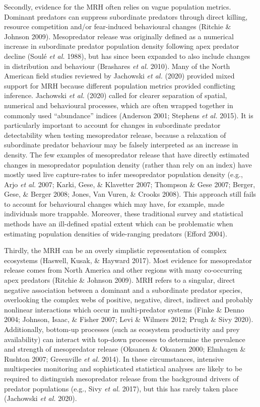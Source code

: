 \documentclass[11pt,a4paper,titlepage,twoside,openright]{style/unimelbthesis}
\begin{document}
\begin{mainmatter}
Secondly, evidence for the MRH often relies on vague population metrics. Dominant predators can suppress subordinate predators through direct killing, resource competition and/or fear-induced behavioural changes (Ritchie \& Johnson 2009). Mesopredator release was originally defined as a numerical increase in subordinate predator population density following apex predator decline (Soulé \emph{et al.} 1988), but has since been expanded to also include changes in distribution and behaviour (Brashares \emph{et al.} 2010). Many of the North American field studies reviewed by Jachowski \emph{et al.} (2020) provided mixed support for MRH because different population metrics provided conflicting inference. Jachowski \emph{et al.} (2020) called for clearer separation of spatial, numerical and behavioural processes, which are often wrapped together in commonly used ``abundance'' indices (Anderson 2001; Stephens \emph{et al.} 2015). It is particularly important to account for changes in subordinate predator detectability when testing mesopredator release, because a relaxation of subordinate predator behaviour may be falsely interpreted as an increase in density. The few examples of mesopredator release that have directly estimated changes in mesopredator population density (rather than rely on an index) have mostly used live capture-rates to infer mesopredator population density (e.g., Arjo \emph{et al.} 2007; Karki, Gese, \& Klavetter 2007; Thompson \& Gese 2007; Berger, Gese, \& Berger 2008; Jones, Van Vuren, \& Crooks 2008). This approach still fails to account for behavioural changes which may have, for example, made individuals more trappable. Moreover, these traditional survey and statistical methods have an ill-defined spatial extent which can be problematic when estimating population densities of wide-ranging predators (Efford 2004).

Thirdly, the MRH can be an overly simplistic representation of complex ecosystems (Haswell, Kusak, \& Hayward 2017). Most evidence for mesopredator release comes from North America and other regions with many co-occurring apex predators (Ritchie \& Johnson 2009). MRH refers to a singular, direct negative association between a dominant and a subordinate predator species, overlooking the complex webs of positive, negative, direct, indirect and probably nonlinear interactions which occur in multi-predator systems (Finke \& Denno 2004; Johnson, Isaac, \& Fisher 2007; Levi \& Wilmers 2012; Prugh \& Sivy 2020). Additionally, bottom-up processes (such as ecosystem productivity and prey availability) can interact with top-down processes to determine the prevalence and strength of mesopredator release (Oksanen \& Oksanen 2000; Elmhagen \& Rushton 2007; Greenville \emph{et al.} 2014). In these circumstances, intensive multispecies monitoring and sophisticated statistical analyses are likely to be required to distinguish mesopredator release from the background drivers of predator populations (e.g., Sivy \emph{et al.} 2017), but this has rarely taken place (Jachowski \emph{et al.} 2020).


\end{mainmatter}
\end{document}
